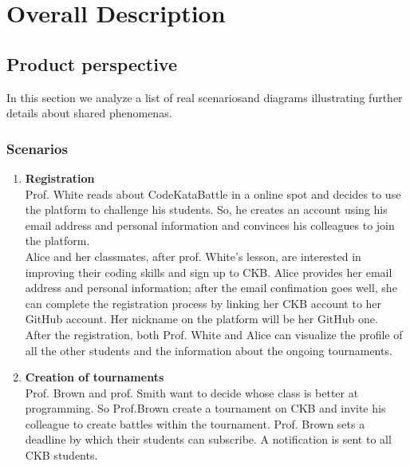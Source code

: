 \chapter{Overall Description}

\section{Product perspective}
In this section we analyze a list of real 
scenariosand diagrams illustrating further details about shared phenomenas.\\

\subsection{Scenarios}
\begin{enumerate}
    \item \textbf{Registration} \\
    Prof. White reads about CodeKataBattle in a online spot and decides to use the platform to 
    challenge his students. So, he creates an account using his email address and personal information
     and convinces his colleagues to join the platform.\\
     Alice and her classmates, after prof. White's lesson, are interested in improving their coding 
     skills and sign up to CKB. Alice provides her email address and personal information; after the email 
     confimation goes well, 
     she can complete the registration process by linking her CKB account to her GitHub account. Her nickname
      on the platform will be her GitHub one.\\
      After the registration, both Prof. White and Alice can visualize the profile of all the other
      students and the information about the ongoing tournaments.
    \item \textbf{Creation of tournaments} \\
    Prof. Brown and prof. Smith want to decide whose class is better at programming. So Prof.Brown
    create a tournament on CKB and invite his colleague to create battles within the tournament. Prof. Brown
    sets a deadline by which their students can subscribe. A notification is sent to all CKB students. \\
    

\end{enumerate}
